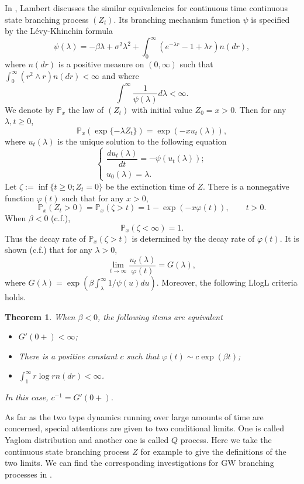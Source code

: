 \documentclass[12pt,a4paper]{amsart}
\theoremstyle{plain}
\newtheorem{thm}{Theorem}[section]
\theoremstyle{definition}
\numberwithin{equation}{section}
\begin{document}
In \cite{Lambert2001Arbres,Lambert2003Coalescence}, Lambert discusses the
similar equivalencies for continuous time continuous state branching process
$(Z_t)$. Its branching mechanism function $\psi$ is specified by the
L\'evy-Khinchin formula
\[
	\psi(\lambda)=-\beta\lambda+\sigma^2\lambda^2+\int_0^\infty \left(e^{-\lambda r}-1+\lambda r\right)n(dr),
\]
where $n(dr)$ is a positive measure on $(0,\infty)$ such that $\int_0^\infty
(r^2\wedge r) n(dr)<\infty$ and where
\begin{equation}\label{extinc assump  for continuous}
	\int^\infty\frac{1}{\psi(\lambda)}d\lambda<\infty.
\end{equation}
We denote by $\mathbb P_x$ the law of $(Z_t)$ with initial value $Z_0=x>0$. Then
for any $\lambda, t\geq 0$,
\[
	\mathbb P_x\left(\exp\{-\lambda Z_t\}\right)=\exp(-xu_t(\lambda)),
\]
where $u_t(\lambda)$ is the unique solution to the following equation
\begin{equation}
\begin{cases}
	\dfrac{d u_t(\lambda)}{dt}=-\psi(u_t(\lambda));\\
u_0(\lambda)=\lambda.
\end{cases}
\end{equation}
Let $\zeta:=\inf\{t\geq 0; Z_t=0\}$ be the extinction time of $Z$. There is a
nonnegative function $\varphi(t)$ such that for any $x>0$,
\[
	\mathbb P_x(Z_t>0)=\mathbb P_x(\zeta>t)=1-\exp(-x\varphi(t)), \qquad t>0.
\]
When $\beta<0$ (c.f.\cite{Grey1974Asymptotic}),
\[
	\mathbb P_x(\zeta<\infty)=1.
\]
Thus the decay rate of $\mathbb P_x(\zeta>t)$ is determined by the decay rate of
$\varphi(t)$. It is shown (c.f.\cite{Lambert2007Quasi-stationary}) that for any
$\lambda>0$,
\[
	\lim_{t\rightarrow\infty}\frac{u_t(\lambda)}{\varphi(t)}=G(\lambda),
\]
where $G(\lambda)=\exp(\beta\int_{\lambda}^\infty1/\psi(u)du)$. Moreover, the
following LlogL criteria holds.
\begin{thm}
  \label{equivalent for cbp}
	When $\beta<0$, the following items are equivalent
\begin{itemize}
\item[$(i).$] $G'(0+)<\infty$;
\item[$(ii).$] There is a positive constant $c$ such that $\varphi(t)\sim
  c\exp(\beta t)$;
\item[$(iii).$] $\int_1^\infty r\log r n(dr)<\infty$.
\end{itemize}
In this case, $c^{-1}=G'(0+)$.
\end{thm}
As far as the two type dynamics running over large amounts of time are
concerned, special attentions are given to two conditional limits. One is called
Yaglom distribution and another one is called $Q$ process. Here we take the
continuous state branching process $Z$ for example to give the definitions of
the two limits. We can find the corresponding investigations for GW branching
processes in \cite{AthreyaNey1972Branching}.
\end{document}
